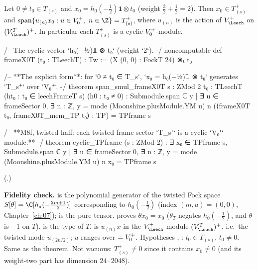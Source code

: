 \begin{theorem}\label{ch11:thm:cyclicTP}
Let $0\ne t_0\in T_{(s)}$ and $x_0=h_0(-\tfrac12)\mathbf 1\otimes t_0$ (weight $\tfrac32+\tfrac12=2$).
Then $x_0\in T_{(s)}^+$ and
$\operatorname{span}\{u_{(n)}x_0 : u\in\chelVz,\ n\in\Z\}=T_{(s)}^+$, where $u_{(n)}$ is the action of
$V_\Leech^+$ on $(V_\Leech^T)^+$.  In particular each $T_{(s)}^+$ is a cyclic $V_0^{+}$-module.
\end{theorem}
\begin{leancode}
/-- The cyclic vector `h₀(−½)𝟙 ⊗ t₀` (weight `2`). -/
noncomputable def frameX0T (t₀ : TLeechT) : Tw := (X (0, 0) : FockT 24) ⊗ₜ t₀

/-- **The explicit form**: for `0 ≠ t₀ ∈ T_s`, `x₀ = h₀(−½)𝟙 ⊗ t₀` generates `T_s⁺` over `V₀⁺`. -/
theorem span_smul_frameX0T {s : ZMod 2} {t₀ : TLeechT} (ht₀ : t₀ ∈ leechFrameT s) (h0 : t₀ ≠ 0) :
    Submodule.span ℂ {y | ∃ u ∈ frameSector 0, ∃ n : ℤ,
        y = mode (Moonshine.plusModule.YM u) n (⟨frameX0T t₀, frameX0T_mem_TP t₀⟩ : TP)}
      = TPframe s

/-- **M8f, twisted half: each twisted frame sector `T_s⁺` is a cyclic `V₀⁺`-module.** -/
theorem cyclic_TPframe (s : ZMod 2) : ∃ x₀ ∈ TPframe s,
    Submodule.span ℂ {y | ∃ u ∈ frameSector 0, ∃ n : ℤ, y = mode (Moonshine.plusModule.YM u) n x₀}
      = TPframe s
\end{leancode}
(.)
\begin{dictionary}
\textbf{Fidelity check.}   is the polynomial generator of the twisted
Fock space $S[\theta]=\C[h_a(-\tfrac{2m+1}{2})]$ corresponding to $h_0(-\tfrac12)$ (index $(m,a)=(0,0)$,
Chapter~\ref{ch:07});  is the pure tensor.   proves $\theta x_0=x_0$
($\theta_T$ negates $h_0(-\tfrac12)$, and $\theta$ is $-1$ on $T$).   is the type of $T$.
 is $u_{(n)}x$ in the $V_\Leech^+$-module
$(V_\Leech^T)^+$, i.e.\ the twisted mode $u_{(2n/2)}$; $u$ ranges over $=V_0^{+}$.
Hypotheses , : $t_0\in T_{(s)}$, $t_0\ne0$.  Same as the theorem.  Not vacuous:
$T_{(s)}^+\neq0$ since it contains $x_0\neq0$ (and its weight-two part has dimension $24\cdot2048$).
\end{dictionary}

